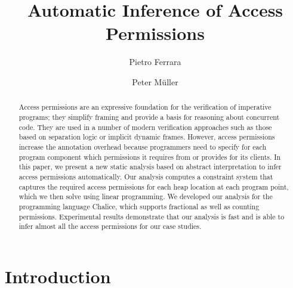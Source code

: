 \documentclass{llncs}
\newenvironment{keywords}{
       \list{}{\advance\topsep by0.35cm\relax\small
       \leftmargin=1cm
       \labelwidth=0.35cm
       \listparindent=0.35cm
       \itemindent\listparindent
       \rightmargin\leftmargin}\item[\hskip\labelsep
                                     \bfseries Key words:]}
{\endlist}
\begin{document}
\title{Automatic Inference of Access Permissions}

\author{Pietro Ferrara \and Peter M\"uller}

\maketitle

\goup
\goup
\goup
\goup
\begin{abstract}
Access permissions are an expressive foundation for the verification
of imperative programs; they simplify framing and provide a
basis for reasoning about concurrent code. They are used in a number
of modern verification approaches such as those based on separation
logic or implicit dynamic frames. However, access permissions increase
the annotation overhead because programmers need to specify for each
program component which permissions it requires from or provides for
its clients. In this paper, we present a new static analysis based on
abstract interpretation to infer access permissions automatically.
Our analysis computes a constraint system that captures the required
access permissions for each heap location at each
program point, which we then solve using linear programming. We 
developed our analysis for the programming language Chalice, which
supports fractional as well as counting permissions. 
Experimental results demonstrate that our analysis is fast and is able
to infer almost all the access permissions for our case studies.
\end{abstract}
\goup
\goup
\goup
\goup
\section{Introduction}
\goup
\end{document}
